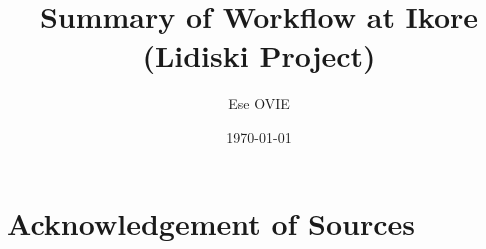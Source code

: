 \documentclass[a4paper, 12pt, notitlepage]{report}
\title{Summary of Workflow at Ikore \\ (Lidiski Project)} %
\author{Ese OVIE} %
\date{\today} %
\begin{document}
\maketitle
\thispagestyle{empty}
\newpage
\section*{Acknowledgement of Sources} %
%
%
%

\tableofcontents 


\end{document}

